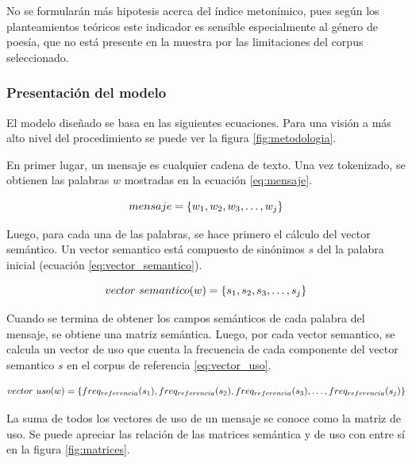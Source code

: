 \documentclass[12pt,letterpaper,twoside]{article}
\begin{document}
No se formularán más hipotesis acerca del índice metonímico, pues según los planteamientos teóricos este indicador
es sensible especialmente al género de poesía, que no está presente en la muestra por las limitaciones del corpus
seleccionado.



\subsubsection{Presentación del modelo}
\label{sec:org9ada679}

El modelo diseñado se basa en las siguientes ecuaciones. Para una
visión a más alto nivel del procedimiento se puede ver la figura
\ref{fig:metodologia}.

En primer lugar, un mensaje es cualquier cadena de texto. Una vez
tokenizado, se obtienen las palabras \(w\) mostradas en la ecuación
\ref{eq:mensaje}.


      \begin{equation}\label{eq:mensaje}
mensaje = \{ w_1, w_2, w_3, \dots , w_j \} \\
\end{equation}


 Luego, para cada una de las palabras, se hace
primero el cálculo del vector semántico. Un vector semantico está
compuesto de sinónimos \(s\) del la palabra inicial (ecuación
\ref{eq:vector_semantico}).


\begin{equation}\label{eq:vector_semantico}
vector\ semantico(w) = \{s_1, s_2, s_3, \dots, s_j \} \\
\end{equation}


Cuando se termina de obtener los campos
semánticos de cada palabra del mensaje, se obtiene una matriz
semántica. Luego, por cada vector semantico, se calcula un vector de
uso que cuenta la frecuencia de cada componente del vector semantico
\(s\) en el corpus de referencia \ref{eq:vector_uso}.

\begin{equation}\label{eq:vector_uso}
vector\ uso(w) = \{freq_{referencia}(s_1),freq_{referencia}(s_2),freq_{referencia}(s_3), \dots, freq_{referencia}(s_j) \} \\
\end{equation}


La suma de todos los vectores de uso de un mensaje se conoce como la
matriz de uso. Se puede apreciar las relación de las matrices
semántica y de uso con entre sí en la figura \ref{fig:matrices}.
\end{document}
